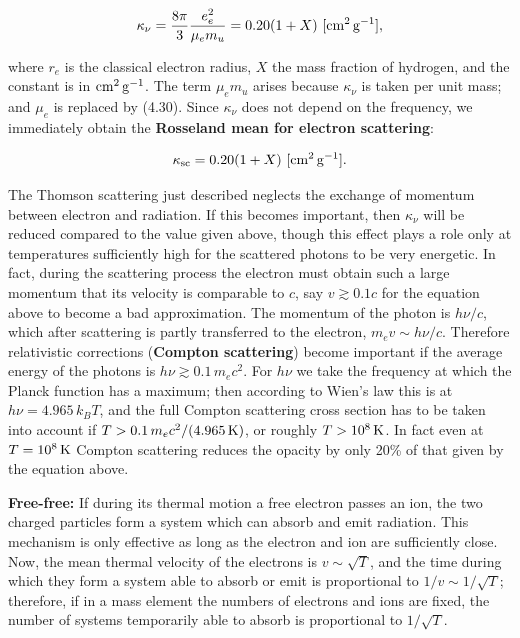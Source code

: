 \documentclass[a4paper,10pt]{article}
\begin{document}
\begin{align*}
    \kappa_\nu = \frac{8\pi}{3} \frac{e_e^2}{\mu_em_u} = 0.20(1+X) ~ [{\rm cm^2\,g^{-1}}],
\end{align*}

{\noindent}where $r_e$ is the classical electron radius, $X$ the mass fraction of hydrogen, and the constant is in ${\rm cm^2\,g^{-1}}$. The term $\mu_em_u$ arises because $\kappa_\nu$ is taken per unit mass; and $\mu_e$ is replaced by (4.30). Since $\kappa_\nu$ does not depend on the frequency, we immediately obtain the \textbf{Rosseland mean for electron scattering}:

\begin{align*}
    \kappa_{\rm sc} = 0.20(1+X) ~ [{\rm cm^2\,g^{-1}}].
\end{align*}

{\noindent}The Thomson scattering just described neglects the exchange of momentum between electron and radiation. If this becomes important, then $\kappa_\nu$ will be reduced compared to the value given above, though this effect plays a role only at temperatures sufficiently high for the scattered photons to be very energetic. In fact, during the scattering process the electron must obtain such a large momentum that its velocity is comparable to $c$, say $v\gtrsim0.1c$ for the equation above to become a bad approximation. The momentum of the photon is $h\nu/c$, which after scattering is partly transferred to the electron, $m_ev\sim h\nu/c$. Therefore relativistic corrections (\textbf{Compton scattering}) become important if the average energy of the photons is $h\nu\gtrsim0.1\,m_ec^2$. For $h\nu$ we take the frequency at which the Planck function has a maximum; then according to Wien's law this is at $h\nu=4.965\,k_BT$, and the full Compton scattering cross section has to be taken into account if $T>0.1\,m_ec^2/(4.965\,{\rm K})$, or roughly $T>10^8\,{\rm K}$. In fact even at $T=10^8\,{\rm K}$ Compton scattering reduces the opacity by only 20\% of that given by the equation above.

{\noindent}\textbf{Free-free:} If during its thermal motion a free electron passes an ion, the two charged particles form a system which can absorb and emit radiation. This mechanism is only effective as long as the electron and ion are sufficiently close. Now, the mean thermal velocity of the electrons is $v\sim\sqrt{T}$, and the time during which they form a system able to absorb or emit is proportional to $1/v\sim1/\sqrt{T}$; therefore, if in a mass element the numbers of electrons and ions are fixed, the number of systems temporarily able to absorb is proportional to $1/\sqrt{T}$.
\end{document}
